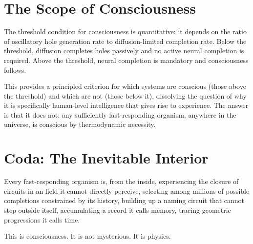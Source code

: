 \section{The Scope of Consciousness}

The threshold condition for consciousness is quantitative: it depends on the ratio of oscillatory hole generation rate to diffusion-limited completion rate. Below the threshold, diffusion completes holes passively and no active neural completion is required. Above the threshold, neural completion is mandatory and consciousness follows.

This provides a principled criterion for which systems are conscious (those above the threshold) and which are not (those below it), dissolving the question of why it is specifically human-level intelligence that gives rise to experience. The answer is that it does not: any sufficiently fast-responding organism, anywhere in the universe, is conscious by thermodynamic necessity.

\section{Coda: The Inevitable Interior}

Every fast-responding organism is, from the inside, experiencing the closure of circuits in an \Hplus field it cannot directly perceive, selecting among millions of possible completions constrained by its history, building up a naming circuit that cannot step outside itself, accumulating a record it calls memory, tracing geometric progressions it calls time.

This is consciousness. It is not mysterious. It is physics.
